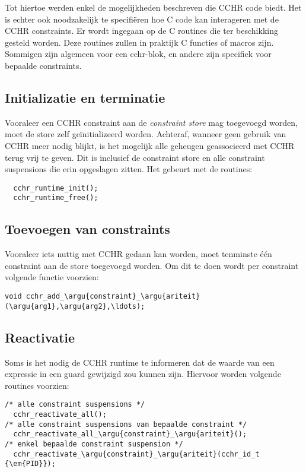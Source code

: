 Tot hiertoe werden enkel de mogelijkheden beschreven die CCHR code biedt. Het is echter ook noodzakelijk te specifi\"eren hoe C code kan interageren met de CCHR constraints. Er wordt ingegaan op de C routines die ter beschikking gesteld worden. Deze routines zullen in praktijk C functies of macros zijn. Sommigen zijn algemeen voor een cchr-blok, en andere zijn specifiek voor bepaalde constraints.

\subsection{Initializatie en terminatie}

Vooraleer een CCHR constraint aan de {\em constraint store} mag toegevoegd worden, moet de store zelf ge\"initializeerd worden. Achteraf, wanneer geen gebruik van CCHR meer nodig blijkt, is het mogelijk alle geheugen geassocieerd met CCHR terug vrij te geven. Dit is inclusief de constraint store en alle constraint suspensions die erin opgeslagen zitten. Het gebeurt met de routines:
\begin{Verbatim}
  cchr_runtime_init();
  cchr_runtime_free();
\end{Verbatim}

\subsection{Toevoegen van constraints}

Vooraleer iets nuttig met CCHR gedaan kan worden, moet tenminste \'e\'en constraint aan de store toegevoegd worden. Om dit te doen wordt per constraint volgende functie voorzien: \begin{Verbatim}[commandchars=\\\{\}]
  void cchr_add_\argu{constraint}_\argu{ariteit}(\argu{arg1},\argu{arg2},\ldots);
\end{Verbatim}

\subsection{Reactivatie} \label{sec:crout-reactiv}

Soms is het nodig de CCHR runtime te informeren dat de waarde van een expressie in een guard gewijzigd zou kunnen zijn. Hiervoor worden volgende routines voorzien: \begin{Verbatim}[commandchars=\\\{\}]
/* alle constraint suspensions */
  cchr_reactivate_all(); 
/* alle constraint suspensions van bepaalde constraint */
  cchr_reactivate_all_\argu{constraint}_\argu{ariteit}();
/* enkel bepaalde constraint suspension */
  cchr_reactivate_\argu{constraint}_\argu{ariteit}(cchr_id_t {\em{PID}});
\end{Verbatim}

